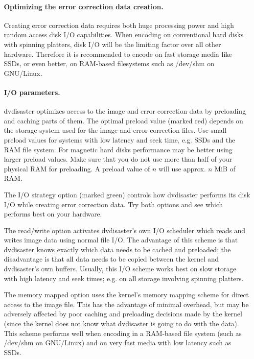 \paragraph{Optimizing the error correction data creation.}\quad
\label{howto-eccfile-advanced-settings-ecc}

Creating error correction data requires both huge processing power
and high random access disk I/O capabilities. When encoding on conventional
hard disks with spinning platters, disk I/O will be the limiting
factor over all other hardware. Therefore it is recommended to encode on
fast storage media like SSDs, or even better, on RAM-based filesystems such
as /dev/shm on GNU/Linux.

\paragraph{I/O parameters.} dvdisaster optimizes access to the
image and error correction data by preloading and caching parts of them.
The optimal preload value (marked red) depends on the storage system
used for the image and error correction files. Use small preload values
for systems with low latency and seek time, e.g. SSDs and the RAM file system.
For magnetic hard disks performance may be better using larger preload values.
Make sure that you do not use more than half of your physical RAM for preloading.
A preload value of $n$ will use approx. $n$ MiB of RAM.

\medskip

The I/O strategy option (marked green) controls how dvdisaster performs
its disk I/O while creating error correction data. Try both options and
see which performs best on your hardware.

The read/write option activates dvdisaster's own I/O scheduler which
reads and writes image data using normal file I/O. The advantage of this
scheme is that dvdisaster knows exactly which data needs to be cached and preloaded;
the disadvantage is that all data needs to be copied between the kernel and
dvdisaster's own buffers. Usually, this I/O scheme works best on slow
storage with high latency and seek times; e.g. on all storage involving spinning platters.

The memory mapped option uses the kernel's memory mapping scheme for direct access
to the image file. This has the advantage of minimal overhead, but may be
adversely affected by poor caching and preloading decisions made by the kernel
(since the kernel does not know what dvdisaster is going to do with the data).
This scheme performs well when encoding in a RAM-based file system
(such as /dev/shm on GNU/Linux) and on very fast media with low latency such as SSDs.

